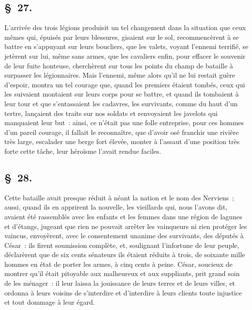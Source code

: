 \documentclass[french,twoside]{book} %
\begin{document}
\subsection[{§ 27.}]{ \textsc{§ 27.} }
\noindent L'arrivée des trois légions produisit un tel changement dans la situation que ceux mêmes qui, épuisés par leurs blessures, gisaient sur le sol, recommencèrent à se battre en s’appuyant sur leurs boucliers, que les valets, voyant l’ennemi terrifié, se jetèrent sur lui, même sans armes, que les cavaliers enfin, pour effacer le souvenir de leur fuite honteuse, cherchèrent sur tous les points du champ de bataille à surpasser les légionnaires. Mais l’ennemi, même alors qu’il ne lui restait guère d’espoir, montra un tel courage que, quand les premiers étaient tombés, ceux qui les suivaient montaient sur leurs corps pour se battre, et quand ils tombaient à leur tour et que s’entassaient les cadavres, les survivants, comme du haut d’un tertre, lançaient des traits sur nos soldats et renvoyaient les javelots qui manquaient leur but : ainsi, ce n’était pas une folle entreprise, pour ces hommes d’un pareil courage, il fallait le reconnaître, que d’avoir osé franchir une rivière très large, escalader une berge fort élevée, monter à l’assaut d’une position très forte cette tâche, leur héroïsme l’avait rendue faciles.
\subsection[{§ 28.}]{ \textsc{§ 28.} }
\noindent Cette bataille avait presque réduit à néant la nation et le nom des Nerviens ; aussi, quand ils en apprirent la nouvelle, les vieillards qui, nous l’avons dit, avaient été rassemblés avec les enfants et les femmes dans une région de lagunes et d’étangs, jugeant que rien ne pouvait arrêter les vainqueurs ni rien protéger les vaincus, envoyèrent, avec le consentement unanime des survivants, des députés à César : ils firent soumission complète, et, soulignant l’infortune de leur peuple, déclarèrent que de six cents sénateurs ils étaient réduits à trois, de soixante mille hommes en état de porter les armes, à cinq cents à peine. César, soucieux de montrer qu’il était pitoyable aux malheureux et aux suppliants, prit grand soin de les ménager : il leur laissa la jouissance de leurs terres et de leurs villes, et ordonna à leurs voisins de s’interdire et d’interdire à leurs clients toute injustice et tout dommage à leur égard.
\end{document}
